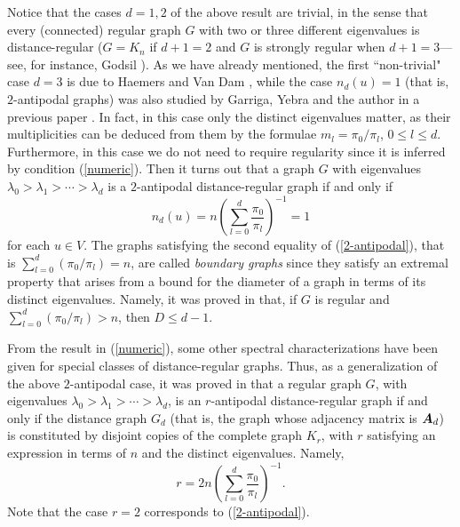 \documentclass[11pt]{article}
\def\A{\mbox{\boldmath $A$}}
\begin{document}
Notice that the cases $d=1,2$  of the above result are trivial, in the
sense that every (connected) regular graph $G$ with two or three 
different eigenvalues is distance-regular ($G=K_n$ if $d+1=2$ and
$G$ is strongly regular when $d+1=3$---see, for instance, Godsil
\cite{g93}). As we have already mentioned, the first
``non-trivial" case $d=3$ is due to Haemers and Van Dam
\cite{vdh96},  while the  case $n_d(u)=1$ (that is,  $2$-antipodal
graphs) was also studied  by Garriga, Yebra and the author in a
previous paper \cite{fgy98}.
In fact, in this case only the distinct
eigenvalues matter, as their multiplicities can be deduced from
them by the formulae $m_l=\pi_0/\pi_l$, $0\le l\le d$.
Furthermore, in this case we do not need to require regularity  
since it is  inferred by  condition (\ref{numeric}). Then it turns out
that a graph $G$ with eigenvalues
$\lambda_0>\lambda_1>\cdots>\lambda_d$ is a $2$-antipodal
distance-regular graph if and only if
\begin{equation}

\label{2-antipodal}
n_{d}(u)=n\left(\sum_{l=0}^{d}\frac{\pi_0}{\pi_l}\right)^{-1}=1
\end{equation}
for each  $u\in V$.
The graphs satisfying the second equality of (\ref{2-antipodal}),
that is $\sum_{l=0}^{d}(\pi_0/\pi_l)=n$, are called 
{\it boundary graphs} since they  satisfy  an extremal property that
arises from a bound for the diameter of a graph in terms of its 
distinct eigenvalues. Namely, it was proved in \cite{fgy96-1} that, 
if $G$ is regular and $\sum_{l=0}^{d}(\pi_0/\pi_l)>n$, then  
$D\le d-1$. 

From the result in (\ref{numeric}), some other spectral
characterizations have been given for special classes of
distance-regular graphs.  Thus, as a generalization of the above
$2$-antipodal case, it was proved in
\cite{f97} that  a regular graph $G$, with 
eigenvalues $\lambda_0>\lambda_1>\cdots>\lambda_d$, is
an $r$-antipodal distance-regular graph if and only if the distance
graph $G_d$ (that is, the graph whose adjacency matrix is $\A_d$) is
constituted by disjoint copies of the complete graph
$K_r$, with $r$ satisfying an expression in terms of
$n$ and the distinct eigenvalues. Namely, 
\begin{equation} 
\label{antipodal}
r=2n\left(\sum_{l=0}^d\frac{\pi_0}{\pi_l}\right)^{-1}.
\end{equation}
Note that the case $r=2$ corresponds to (\ref{2-antipodal}). 
\end{document}
